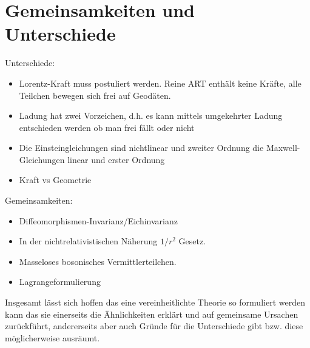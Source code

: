 \section{Gemeinsamkeiten und Unterschiede}
Unterschiede:
\begin{itemize}
  \item Lorentz-Kraft muss postuliert werden. Reine ART enthält keine Kräfte,
  alle Teilchen bewegen sich frei auf Geodäten.
  \item Ladung hat zwei Vorzeichen, d.h. es kann mittels umgekehrter Ladung
  entschieden werden ob man frei fällt oder nicht
  \item Die Einsteingleichungen sind nichtlinear und zweiter Ordnung die
  Maxwell-Gleichungen linear und erster Ordnung
  \item Kraft vs Geometrie
\end{itemize}
Gemeinsamkeiten:
\begin{itemize}
  \item Diffeomorphismen-Invarianz/Eichinvarianz
  \item In der nichtrelativistischen Näherung $1/r^2$ Gesetz.
  \item Masseloses bosonisches Vermittlerteilchen.
  \item Lagrangeformulierung
\end{itemize}
Insgesamt lässt sich hoffen das eine vereinheitlichte Theorie so formuliert
werden kann das sie einerseits die Ähnlichkeiten erklärt und auf gemeinsame
Ursachen zurückführt, andererseits aber auch Gründe für die Unterschiede gibt
bzw. diese möglicherweise ausräumt.
